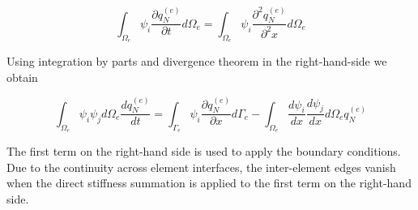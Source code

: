 \documentclass[11pt,a4paper]{article}
\begin{document}
	\begin{equation}
	    \int_{\Omega_e}\psi_i\dfrac{\partial q_N^{(e)}}{\partial t}d{\Omega_e} = \int_{\Omega_e}\psi_i\dfrac{\partial^2 q_N^{(e)}}{\partial^2 x}d{\Omega_e}
	\end{equation}
	
	Using integration by parts and divergence theorem in the right-hand-side we obtain
	
	\begin{equation}
	    \int_{\Omega_e}\psi_i\psi_jd{\Omega_e}\dfrac{d q_N^{(e)}}{dt} = \int_{\Gamma_e}\psi_i\dfrac{\partial q_N^{(e)}}{\partial x}d{\Gamma_e} - \int_{\Omega_e}\dfrac{d\psi_i}{dx}\dfrac{d\psi_j}{d x}d{\Omega_e}q_N^{(e)}
	    \label{eq:20}
	\end{equation}
	
	The first term on the right-hand side is used to apply the boundary conditions. Due to the continuity across element interfaces, the inter-element edges vanish when the direct stiffness summation is applied to the first term on the right-hand side.
	
\end{document}
